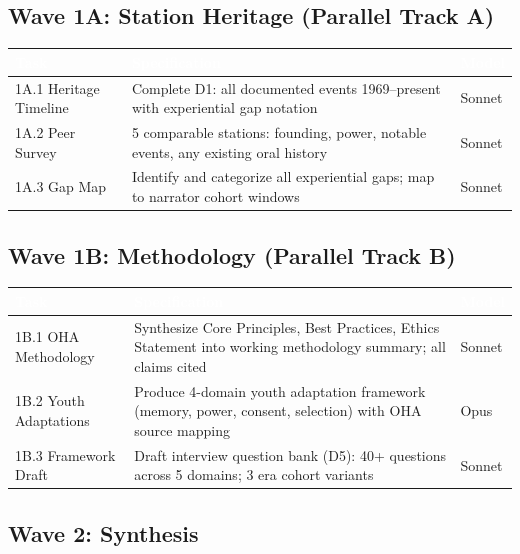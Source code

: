 \documentclass[11pt,letterpaper]{article}
\newcommand{\tableheader}[1]{\textbf{\sffamily\textcolor{white}{#1}}}
\begin{document}
\subsection{Wave 1A: Station Heritage (Parallel Track A)}

\begin{center}
\begin{tabularx}{\textwidth}{L{2.5cm}XC{2cm}}
\toprule
{}
\tableheader{Task} & \tableheader{Specification} & \tableheader{Model} \\
\midrule
1A.1 Heritage Timeline & Complete D1: all documented events 1969--present with experiential gap notation & Sonnet \\
1A.2 Peer Survey & 5 comparable stations: founding, power, notable events, any existing oral history & Sonnet \\
1A.3 Gap Map & Identify and categorize all experiential gaps; map to narrator cohort windows & Sonnet \\
\bottomrule
\end{tabularx}
\end{center}

\subsection{Wave 1B: Methodology (Parallel Track B)}

\begin{center}
\begin{tabularx}{\textwidth}{L{2.5cm}XC{2cm}}
\toprule
{}
\tableheader{Task} & \tableheader{Specification} & \tableheader{Model} \\
\midrule
1B.1 OHA Methodology & Synthesize Core Principles, Best Practices, Ethics Statement into working methodology summary; all claims cited & Sonnet \\
1B.2 Youth Adaptations & Produce 4-domain youth adaptation framework (memory, power, consent, selection) with OHA source mapping & Opus \\
1B.3 Framework Draft & Draft interview question bank (D5): 40+ questions across 5 domains; 3 era cohort variants & Sonnet \\
\bottomrule
\end{tabularx}
\end{center}

\subsection{Wave 2: Synthesis}
\end{document}
